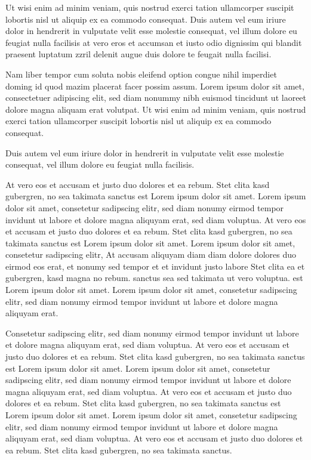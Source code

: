 Ut wisi enim ad minim veniam, quis nostrud exerci tation ullamcorper suscipit lobortis nisl ut aliquip ex ea commodo consequat. Duis autem vel eum iriure dolor in hendrerit in vulputate velit esse molestie consequat, vel illum dolore eu feugiat nulla facilisis at vero eros et accumsan et iusto odio dignissim qui blandit praesent luptatum zzril delenit augue duis dolore te feugait nulla facilisi.

Nam liber tempor cum soluta nobis eleifend option congue nihil imperdiet doming id quod mazim placerat facer possim assum. Lorem ipsum dolor sit amet, consectetuer adipiscing elit, sed diam nonummy nibh euismod tincidunt ut laoreet dolore magna aliquam erat volutpat. Ut wisi enim ad minim veniam, quis nostrud exerci tation ullamcorper suscipit lobortis nisl ut aliquip ex ea commodo consequat.

Duis autem vel eum iriure dolor in hendrerit in vulputate velit esse molestie consequat, vel illum dolore eu feugiat nulla facilisis.

At vero eos et accusam et justo duo dolores et ea rebum. Stet clita kasd gubergren, no sea takimata sanctus est Lorem ipsum dolor sit amet. Lorem ipsum dolor sit amet, consetetur sadipscing elitr, sed diam nonumy eirmod tempor invidunt ut labore et dolore magna aliquyam erat, sed diam voluptua. At vero eos et accusam et justo duo dolores et ea rebum. Stet clita kasd gubergren, no sea takimata sanctus est Lorem ipsum dolor sit amet. Lorem ipsum dolor sit amet, consetetur sadipscing elitr, At accusam aliquyam diam diam dolore dolores duo eirmod eos erat, et nonumy sed tempor et et invidunt justo labore Stet clita ea et gubergren, kasd magna no rebum. sanctus sea sed takimata ut vero voluptua. est Lorem ipsum dolor sit amet. Lorem ipsum dolor sit amet, consetetur sadipscing elitr, sed diam nonumy eirmod tempor invidunt ut labore et dolore magna aliquyam erat.

Consetetur sadipscing elitr, sed diam nonumy eirmod tempor invidunt ut labore et dolore magna aliquyam erat, sed diam voluptua. At vero eos et accusam et justo duo dolores et ea rebum. Stet clita kasd gubergren, no sea takimata sanctus est Lorem ipsum dolor sit amet. Lorem ipsum dolor sit amet, consetetur sadipscing elitr, sed diam nonumy eirmod tempor invidunt ut labore et dolore magna aliquyam erat, sed diam voluptua. At vero eos et accusam et justo duo dolores et ea rebum. Stet clita kasd gubergren, no sea takimata sanctus est Lorem ipsum dolor sit amet. Lorem ipsum dolor sit amet, consetetur sadipscing elitr, sed diam nonumy eirmod tempor invidunt ut labore et dolore magna aliquyam erat, sed diam voluptua. At vero eos et accusam et justo duo dolores et ea rebum. Stet clita kasd gubergren, no sea takimata sanctus.

